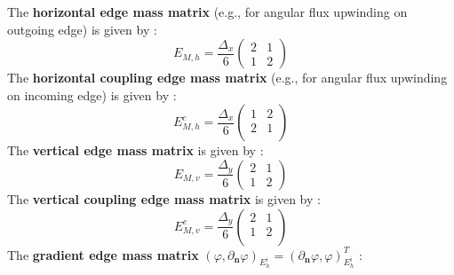 \documentclass{mc2013}
\newcommand\bs{\boldsymbol}
\newcommand\tf{\varphi}
\renewcommand{\(}{\left(}
\renewcommand{\)}{\right)}
\renewcommand{\[}{\left[}
\renewcommand{\]}{\right]}
\begin{document}
The {\bf horizontal edge mass matrix} (e.g., for angular flux upwinding on outgoing edge) is given by :
\begin{equation}
E_{M,h} = \frac{{\Delta _x}}{6}
\begin{pmatrix}
2 & 1 \\
1 & 2 
\end{pmatrix}
\end{equation}
The {\bf horizontal coupling edge mass matrix} (e.g., for angular flux upwinding on incoming edge) is given by :
\begin{equation}
E_{M,h}^c = \frac{{\Delta _x}}{6}
\begin{pmatrix}
1 & 2 \\
2 & 1 \\
\end{pmatrix}
\end{equation}
The {\bf vertical edge mass matrix} is given by :
\begin{equation}
E_{M,v} = \frac{{\Delta _y}}{6}
\begin{pmatrix}
2 & 1\\
1 & 2
\end{pmatrix}
\end{equation}
The {\bf vertical coupling edge mass matrix} is given by :
\begin{equation}
E_{M,v}^c = \frac{{\Delta _y}}{6}
\begin{pmatrix}
2 & 1 \\
1 & 2 \\
\end{pmatrix}
\end{equation}
The {\bf gradient edge mass matrix} $(\tf,\partial_{\bs{n}}
\tf)_{E_h^i}=\(\partial_{\bs{n}}\tf,\tf\)_{E_h^i}^T$ :
\end{document}
